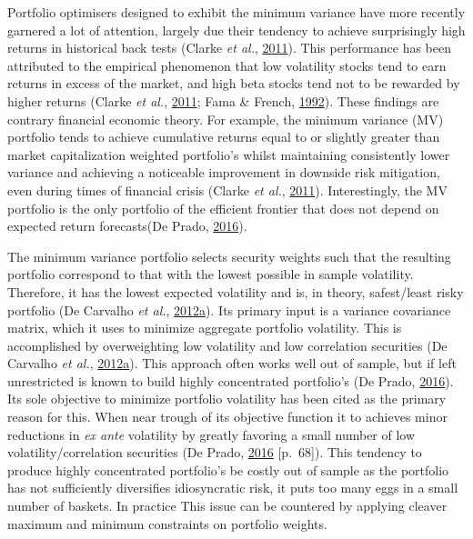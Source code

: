 \documentclass[11pt,preprint, authoryear]{elsarticle}
\numberwithin{equation}{section}
\numberwithin{figure}{section}
\numberwithin{table}{section}
\begin{document}
Portfolio optimisers designed to exhibit the minimum variance have more
recently garnered a lot of attention, largely due their tendency to
achieve surprisingly high returns in historical back tests (Clarke
\emph{et al.}, \protect\hyperlink{ref-clarke2011}{2011}). This
performance has been attributed to the empirical phenomenon that low
volatility stocks tend to earn returns in excess of the market, and high
beta stocks tend not to be rewarded by higher returns (Clarke \emph{et
al.}, \protect\hyperlink{ref-clarke2011}{2011}; Fama \& French,
\protect\hyperlink{ref-fama1992}{1992}). These findings are contrary
financial economic theory. For example, the minimum variance (MV)
portfolio tends to achieve cumulative returns equal to or slightly
greater than market capitalization weighted portfolio's whilst
maintaining consistently lower variance and achieving a noticeable
improvement in downside risk mitigation, even during times of financial
crisis (Clarke \emph{et al.}, \protect\hyperlink{ref-clarke2011}{2011}).
Interestingly, the MV portfolio is the only portfolio of the efficient
frontier that does not depend on expected return forecasts(De Prado,
\protect\hyperlink{ref-lopez}{2016}).

The minimum variance portfolio selects security weights such that the
resulting portfolio correspond to that with the lowest possible in
sample volatility. Therefore, it has the lowest expected volatility and
is, in theory, safest/least risky portfolio (De Carvalho \emph{et al.},
\protect\hyperlink{ref-rawl2012}{2012}\protect\hyperlink{ref-rawl2012}{a}).
Its primary input is a variance covariance matrix, which it uses to
minimize aggregate portfolio volatility. This is accomplished by
overweighting low volatility and low correlation securities (De Carvalho
\emph{et al.},
\protect\hyperlink{ref-rawl2012}{2012}\protect\hyperlink{ref-rawl2012}{a}).
This approach often works well out of sample, but if left unrestricted
is known to build highly concentrated portfolio's (De Prado,
\protect\hyperlink{ref-lopez}{2016}). Its sole objective to minimize
portfolio volatility has been cited as the primary reason for this. When
near trough of its objective function it to achieves minor reductions in
\emph{ex ante} volatility by greatly favoring a small number of low
volatility/correlation securities (De Prado,
\protect\hyperlink{ref-lopez}{2016} {[}p.~68{]}). This tendency to
produce highly concentrated portfolio's be costly out of sample as the
portfolio has not sufficiently diversifies idiosyncratic risk, it puts
too many eggs in a small number of baskets. In practice This issue can
be countered by applying cleaver maximum and minimum constraints on
portfolio weights.
\end{document}
